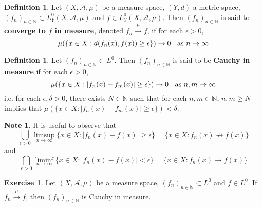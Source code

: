 \documentclass[12pt]{amsart}
\theoremstyle{definition}
\newtheorem{defn}[definition]{Definition}
\newtheorem{note}[definition]{Note}
\newtheorem{ex}[definition]{Exercise}
\newcommand{\del}{\delta}
\newcommand{\ep}{\epsilon}
\newcommand{\N}{\mathbb{N}}
\newcommand{\MA}{\mathcal{A}}
\newcommand{\conv}[1]{\xrightarrow{#1}}
\newcommand{\lex}[1]{\label{ex:#1}}
\newcommand{\ld}[1]{\label{defn:#1}}
\begin{document}
	\begin{defn} \ld{35001} 
		Let $(X, \MA, \mu)$ be a measure space, $(Y,d)$ a metric space, $(f_n)_{n \in \N} \subset L_Y^0(X, \MA, \mu)$ and $f \in L_Y^0(X, \MA, \mu)$. Then $(f_n)_{n \in \N}$ is said to \textbf{converge to $f$ in measure}, denoted $f_n \xrightarrow{\mu} f$, if for each $\ep > 0$, $$\mu(\{x \in X: d(f_n(x), f(x)) \geq \ep \}) \rightarrow 0 \hspace{.2cm }\text{ as } n \rightarrow \infty$$
	\end{defn}
	
	\begin{defn} \ld{35002} 
	Let $(f_n)_{n \in \N} \subset L^0$. Then $(f_n)_{n \in \N}$ is said to be \textbf{Cauchy in measure} if for each $\ep >0$, $$\mu(\{x \in X: |f_n(x) - f_m(x)| \geq \ep \}) \rightarrow 0 \hspace{.2cm }\text{ as } n,m \rightarrow \infty$$ 
	i.e. for each $\ep, \del >0$, there exists $N \in \N$ such that for each $n,m \in \N$, $n,m \geq N$ implies that $\mu(\{x \in X: |f_n(x) - f_m(x)| \geq \ep \}) < \del$.
	\end{defn}
	
	\begin{note}
		It is useful to observe that 
		$$\bigcup_{\ep >0}\limsup\limits_{n \rightarrow \infty} \{x \in X: |f_n(x) - f(x)| \geq \ep \} = \{x \in X: f_n(x) \not \rightarrow f(x) \}$$ 
		and 
		$$\bigcap_{\ep > 0} \liminf_{n \rightarrow \infty}\{x \in X: |f_n(x) - f(x)| < \ep \} = \{x \in X: f_n(x) \rightarrow f(x) \}$$ 
	\end{note}
	
	\begin{ex} \lex{35002.1} 
	Let $(X, \MA, \mu)$ be a measure space, $(f_n)_{n \in \N} \subset L^0$ and $f \in L^0$. If $f_n \conv{\mu} f$, then $(f_n)_{n \in \N}$ is Cauchy in measure.
	\end{ex}
	
\end{document}
